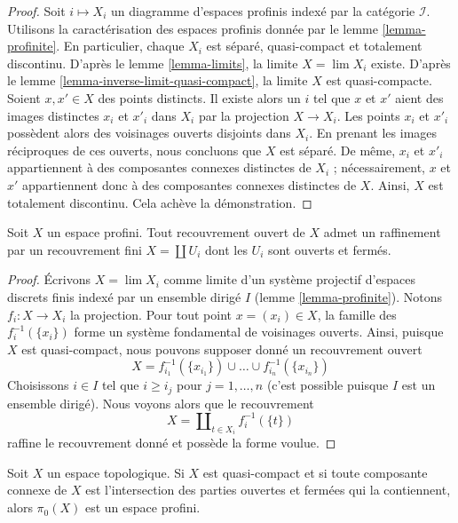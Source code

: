 \begin{proof}
Soit $i \mapsto X_i$ un diagramme d'espaces profinis
indexé par la catégorie $\mathcal{I}$.
Utilisons la caractérisation des espaces profinis donnée par le
lemme \ref{lemma-profinite}. En particulier, chaque $X_i$ est
séparé, quasi-compact et totalement discontinu.
D'après le lemme \ref{lemma-limits}, la limite $X = \lim X_i$ existe.
D'après le lemme \ref{lemma-inverse-limit-quasi-compact},
la limite $X$ est quasi-compacte. Soient $x, x' \in X$ des points distincts.
Il existe alors un $i$ tel que $x$ et $x'$ aient des images distinctes
$x_i$ et $x'_i$ dans $X_i$ par la projection $X \to X_i$.
Les points $x_i$ et $x'_i$ possèdent alors des voisinages ouverts disjoints
dans $X_i$. En prenant les images réciproques de ces ouverts, nous concluons
que $X$ est séparé.
De même, $x_i$ et $x'_i$ appartiennent à des composantes connexes distinctes
de $X_i$ ; nécessairement, $x$ et $x'$ appartiennent donc à des composantes
connexes distinctes de $X$. Ainsi, $X$ est totalement discontinu.
Cela achève la démonstration.
\end{proof}

\begin{lemma}
\label{lemma-profinite-refine-open-covering}
Soit $X$ un espace profini. Tout recouvrement ouvert de $X$ admet un
raffinement par un recouvrement fini $X = \coprod U_i$ dont les $U_i$ sont
ouverts et fermés.
\end{lemma}

\begin{proof}
Écrivons $X = \lim X_i$ comme limite d'un système projectif d'espaces discrets
finis indexé par un ensemble dirigé $I$ (lemme \ref{lemma-profinite}).
Notons $f_i : X \to X_i$ la projection.
Pour tout point $x = (x_i) \in X$, la famille des $f_i^{-1}(\{x_i\})$ forme
un système fondamental de voisinages ouverts. Ainsi, puisque $X$ est
quasi-compact, nous pouvons supposer donné un recouvrement ouvert
$$
X = f_{i_1}^{-1}(\{x_{i_1}\}) \cup \ldots \cup f_{i_n}^{-1}(\{x_{i_n}\})
$$
Choisissons $i \in I$ tel que $i \geq i_j$ pour $j = 1, \ldots, n$ (c'est
possible puisque $I$ est un ensemble dirigé). Nous voyons alors que le
recouvrement
$$
X = \coprod\nolimits_{t \in X_i} f_i^{-1}(\{t\})
$$
raffine le recouvrement donné et possède la forme voulue.
\end{proof}

\begin{lemma}
\label{lemma-pi0-profinite}
Soit $X$ un espace topologique. Si $X$ est quasi-compact et si toute composante
connexe de $X$ est l'intersection des parties ouvertes et fermées qui la
contiennent, alors $\pi_0(X)$ est un espace profini.
\end{lemma}

